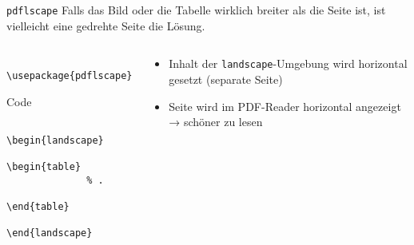 \begin{frame}[fragile]{\texttt{pdflscape}}
  Falls das Bild oder die Tabelle wirklich breiter als die Seite ist, ist vielleicht eine gedrehte Seite die Lösung.
  \begin{columns}[onlytextwidth, t]
    \begin{column}{0.50\textwidth}
      \begin{Packages}
        \begin{lstlisting}
          \usepackage{pdflscape}
        \end{lstlisting}
      \end{Packages}
      \begin{block}{Code}
        \begin{lstlisting}
          \begin{landscape}
            \begin{table}
              % .
            \end{table}
          \end{landscape}
        \end{lstlisting}
      \end{block}
    \end{column}
    \begin{column}{0.46\textwidth}
      \begin{itemize}
        \item Inhalt der \texttt{landscape}-Umgebung wird horizontal gesetzt (separate Seite)
        \item Seite wird im PDF-Reader horizontal angezeigt → schöner zu lesen
      \end{itemize}
    \end{column}
  \end{columns}
\end{frame}

